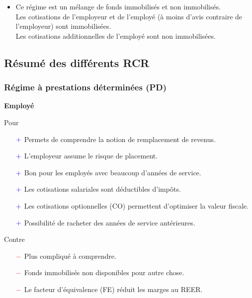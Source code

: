 \documentclass[10pt, french]{article}
\begin{document}
\begin{multicols*}{3}
\begin{definitionNOHFILL}
\begin{itemize}[leftmargin = *]
	\item	Ce régime est un mélange de fonds immobilisés et non immobilisés. \\
			Les cotisations de l'employeur et de l'employé (à moins d’avis contraire de l’employeur) sont immobilisées. \\
			Les cotisations additionnelles de l'employé sont non immobilisées.
\end{itemize}
\end{definitionNOHFILL}

\columnbreak

\subsection*{Résumé des différents RCR}

\subsubsection*{Régime à prestations déterminées (PD)}
\begin{center}
	\textbf{Employé}
\end{center}
Pour
\begin{itemize}
	\item[$\color{blue}+$]	Permets de comprendre la notion de remplacement de revenus.
	\item[$\color{blue}+$]	L'employeur assume le risque de placement.
	\item[$\color{blue}+$]	Bon pour les employés avec beaucoup d'années de service.
	\item[$\color{blue}+$]	Les cotisations salariales sont déductibles d'impôts.
	\item[$\color{blue}+$]	Les cotisations optionnelles (CO) permettent d'optimiser la valeur fiscale.
	\item[$\color{blue}+$]	Possibilité de racheter des années de service antérieures.
\end{itemize}

Contre
\begin{itemize}
	\item[$\color{red}-$]	Plus compliqué à comprendre.
	\item[$\color{red}-$]	Fonds immobilisés non disponibles pour autre chose.
	\item[$\color{red}-$]	Le facteur d'équivalence (FE) réduit les marges au REER.
\end{itemize}


\end{multicols*}
\end{document}
